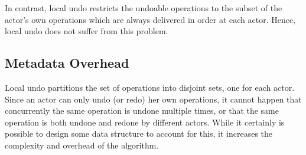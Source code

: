 \documentclass[sigplan,natbib=false,review]{acmart}
\begin{document}
In contrast, local undo restricts the undoable operations to the subset of
the actor's own operations which are always delivered in order at each actor.
Hence, local undo does not suffer from this problem.

\subsection{Metadata Overhead}

Local undo partitions the set of operations into disjoint sets,
one for each actor.
Since an actor can only undo (or redo) her own operations,
it cannot happen that concurrently the same operation is undone multiple times,
or that the same operation is both undone and redone by different actors.
While it certainly is possible to design some data structure to account for this,
it increases the complexity and overhead of the algorithm.
\end{document}
